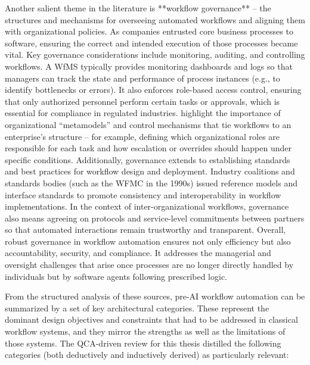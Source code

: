Another salient theme in the literature is **workflow governance** – the structures and mechanisms for overseeing automated workflows and aligning them with organizational policies. As companies entrusted core business processes to software, ensuring the correct and intended execution of those processes became vital. Key governance considerations include monitoring, auditing, and controlling workflows. A WfMS typically provides monitoring dashboards and logs so that managers can track the state and performance of process instances (e.g., to identify bottlenecks or errors). It also enforces role-based access control, ensuring that only authorized personnel perform certain tasks or approvals, which is essential for compliance in regulated industries. \textcite{basuResearch2002} highlight the importance of organizational “metamodels” and control mechanisms that tie workflows to an enterprise’s structure – for example, defining which organizational roles are responsible for each task and how escalation or overrides should happen under specific conditions. Additionally, governance extends to establishing standards and best practices for workflow design and deployment. Industry coalitions and standards bodies (such as the WFMC in the 1990s) issued reference models and interface standards to promote consistency and interoperability in workflow implementations. In the context of inter-organizational workflows, governance also means agreeing on protocols and service-level commitments between partners so that automated interactions remain trustworthy and transparent. Overall, robust governance in workflow automation ensures not only efficiency but also accountability, security, and compliance. It addresses the managerial and oversight challenges that arise once processes are no longer directly handled by individuals but by software agents following prescribed logic.

From the structured analysis of these sources, pre-AI workflow automation can be summarized by a set of key architectural categories. These represent the dominant design objectives and constraints that had to be addressed in classical workflow systems, and they mirror the strengths as well as the limitations of those systems. The QCA-driven review for this thesis distilled the following categories (both deductively and inductively derived) as particularly relevant:

